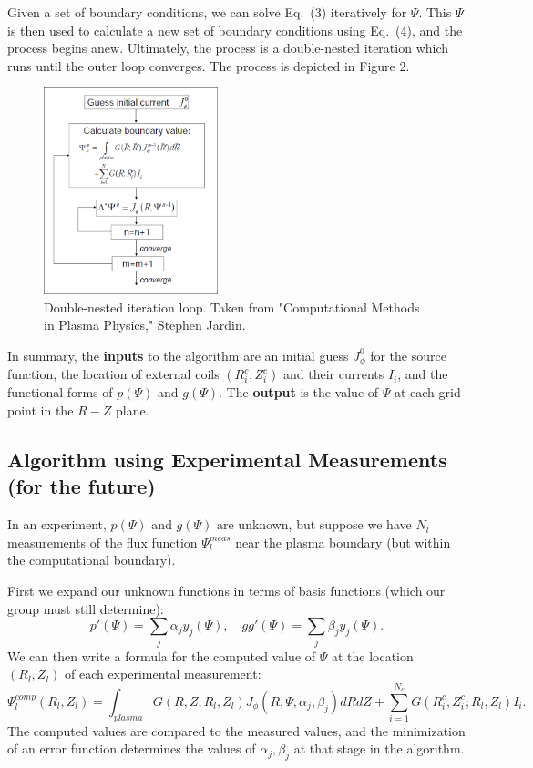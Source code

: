 \documentclass[paper=letter, fontsize=11pt]{scrartcl} %
\begin{document}
Given a set of boundary conditions, we can solve Eq.~(3) iteratively for $\Psi$.  This $\Psi$ is then used to calculate a new set of boundary conditions using Eq.~(4), and the process begins anew.  Ultimately, the process is a double-nested iteration which runs until the outer loop converges.  The process is depicted in Figure 2.

\begin{figure}
\centering
\captionsetup{justification=centering,margin=3cm}
\caption[caption]{Double-nested iteration loop. Taken from "Computational Methods in Plasma Physics," Stephen Jardin.}
\includegraphics[width=0.45\textwidth]{algorithm}
\end{figure}

In summary, the \textbf{inputs} to the algorithm are an initial guess $J_\phi^0$ for the source function, the location of external coils $(R_i^c,Z_i^c)$ and their currents $I_i$, and the functional forms of $p(\Psi)$ and $g(\Psi)$.  The \textbf{output} is the value of $\Psi$ at each grid point in the $R-Z$ plane.  

\subsection{Algorithm using Experimental Measurements (for the future)}

In an experiment, $p(\Psi)$ and $g(\Psi)$ are unknown, but suppose we have $N_l$ measurements of the flux function $\Psi_l^{meas}$ near the plasma boundary (but within the computational boundary).  

First we expand our unknown functions in terms of basis functions (which our group must still determine):
\begin{equation}
p'(\Psi) = \sum_j \alpha_j y_j(\Psi), \quad gg'(\Psi) = \sum_j \beta_j y_j(\Psi).
\end{equation}
We can then write a formula for the computed value of $\Psi$ at the location $(R_l, Z_l)$ of each experimental measurement: 
\begin{equation}
\Psi_l^{comp}(R_l, Z_l) = \int_{plasma} G(R,Z; R_l,Z_l) J_\phi(R,\Psi,\alpha_j,\beta_j) dR dZ + \sum_{i=1}^{N_c} G(R_i^c,Z_i^c; R_l,Z_l) I_i.
\end{equation}
The computed values are compared to the measured values, and the minimization of an error function determines the values of $\alpha_j, \beta_j$ at that stage in the algorithm.   
\end{document}
